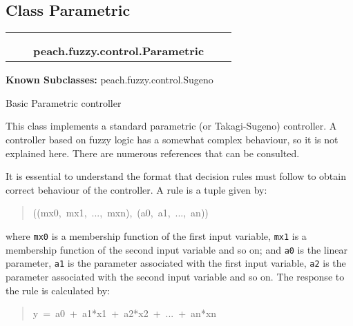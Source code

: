 

\subsection{Class Parametric}

    \label{peach:fuzzy:control:Parametric}
\begin{tabular}{cccccc}
\multicolumn{2}{r}{\settowidth{\BCL}{object}\multirow{2}{\BCL}{object}}
&&
  \\\cline{3-3}
  &&\multicolumn{1}{c|}{}
&&
  \\
&&\multicolumn{2}{l}{\textbf{peach.fuzzy.control.Parametric}}
\end{tabular}

\textbf{Known Subclasses:} peach.fuzzy.control.Sugeno


Basic Parametric controller

This class implements a standard parametric (or Takagi-Sugeno) controller. A
controller based on fuzzy logic has a somewhat complex behaviour, so it is
not explained here. There are numerous references that can be consulted.

It is essential to understand the format that decision rules must follow to
obtain correct behaviour of the controller. A rule is a tuple given by:
%
\begin{quote}{\ttfamily \raggedright \noindent
((mx0,~mx1,~...,~mxn),~(a0,~a1,~...,~an))
}
\end{quote}

where \texttt{mx0} is a membership function of the first input variable, \texttt{mx1}
is a membership function of the second input variable and so on; and \texttt{a0}
is the linear parameter, \texttt{a1} is the parameter associated with the first
input variable, \texttt{a2} is the parameter associated with the second input
variable and so on. The response to the rule is calculated by:
%
\begin{quote}{\ttfamily \raggedright \noindent
y~=~a0~+~a1*x1~+~a2*x2~+~...~+~an*xn
}
\end{quote}

